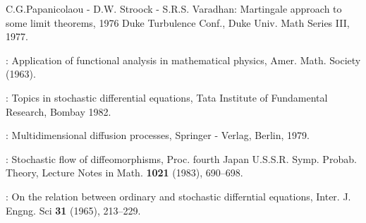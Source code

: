 \begin{thebibliography}{99}
 {C.G.Papanicolaou - D.W. Stroock - S.R.S. Varadhan}:
  Martingale approach to some limit theorems, 1976 Duke Turbulence
  Conf., Duke Univ. Math Series III, 1977. 

:  Application of functional analysis in
  mathematical physics, Amer. Math. Society (1963). 

:  Topics in stochastic differential
  equations, Tata Institute of Fundamental Research, Bombay 1982.  

:  Multidimensional
  diffusion processes, Springer - Verlag, Berlin,  1979. 

:  Stochastic flow of diffeomorphisms,
  Proc. fourth Japan U.S.S.R. Symp. Probab. Theory, Lecture Notes in
  Math. \textbf{1021} (1983), 690--698. 

:  On the relation between ordinary
  and stochastic differntial equations, Inter. J. Engng. Sci \textbf{31}
  (1965), 213--229.
\end{thebibliography}      






